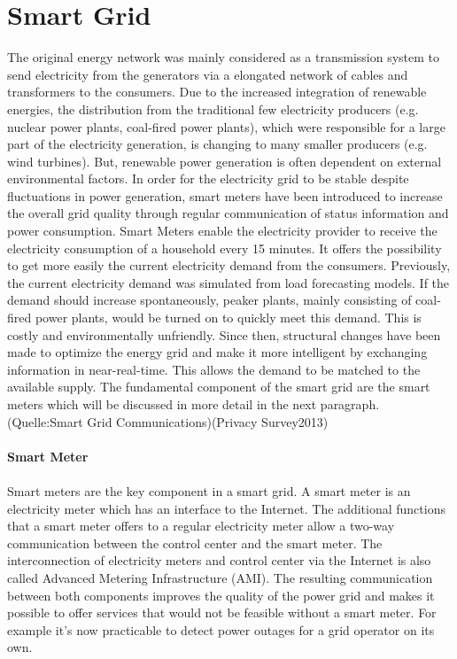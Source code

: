 \section{Smart Grid}
The original energy network was mainly considered as a transmission system to send electricity from the generators via a elongated network of cables and transformers to the consumers.%
Due to the increased integration of renewable energies, the distribution from the traditional few electricity producers (e.g. nuclear power plants, coal-fired power plants), which were responsible for a large part of the electricity generation, is changing to many smaller producers (e.g. wind turbines). %
But, renewable power generation is often dependent on external environmental factors. In order for the electricity grid to be stable despite fluctuations in power generation, smart meters have been introduced to increase the overall grid quality through regular communication of status information and power consumption. Smart Meters enable the electricity provider to receive the electricity consumption of a household every 15 minutes. It offers the possibility to get more easily the current electricity demand from the consumers. Previously, the current electricity demand was simulated from load forecasting models. If the demand should increase spontaneously, peaker plants, mainly consisting of coal-fired power plants, would be turned on to quickly meet this demand. This is costly and environmentally unfriendly. 
Since then, structural changes have been made to optimize the energy grid and make it more intelligent by exchanging information in near-real-time. This allows the demand to be matched to the available supply. The fundamental component of the smart grid are the smart meters which will be discussed in more detail in the next paragraph.(Quelle:Smart Grid Communications)(Privacy Survey2013)\\
\\
\textbf{Smart Meter}
\\
\\
Smart meters are the key component in a smart grid. A smart meter is an electricity meter which has an interface to the Internet. The additional functions that a smart meter offers to a regular electricity meter allow a two-way communication between the control center and the smart meter. The interconnection of electricity meters and control center via the Internet is also called Advanced Metering Infrastructure (AMI). The resulting communication between both components improves the quality of the power grid and makes it possible to offer services that would not be feasible without a smart meter. For example it's now practicable to detect power outages for a grid operator on its own. %
